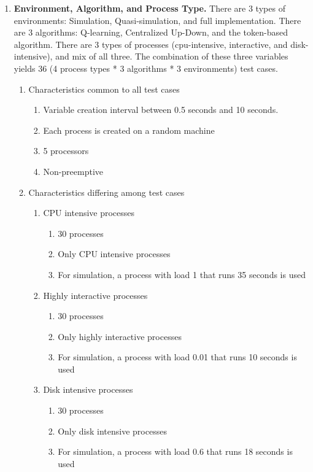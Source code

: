 \documentclass{report}
\begin{document}
\begin{enumerate}
  \item \textbf{Environment, Algorithm, and Process Type.}
	There are 3 types of environments: Simulation, Quasi-simulation, and
	full implementation.  There are 3 algorithms: Q-learning,
	Centralized Up-Down, and the token-based algorithm.  There are 3
	types of processes (cpu-intensive, interactive, and disk-intensive),
	and mix of all three.  The combination of these three variables
	yields 36 (4 process types * 3 algorithms * 3 environments) test
	cases. 

  \begin{enumerate}

	\item Characteristics common to all test cases
	\begin{enumerate}
	    \item Variable creation interval between 0.5 seconds and 10
		seconds. 
      	    \item Each process is created on a random machine
	    \item 5 processors
	    \item Non-preemptive
	\end{enumerate}

	\item Characteristics differing among test cases

	\begin{enumerate}
	   \item CPU intensive processes
	   \begin{enumerate}
		\item 30 processes
		\item Only CPU intensive processes
		\item For simulation, a process with load 1 that runs
		 35 seconds is used
	   \end{enumerate}

	   \item Highly interactive processes
	   \begin{enumerate}
		\item 30 processes
		\item Only highly interactive processes
		\item For simulation, a process with load 0.01 that runs
		 10 seconds is used
	   \end{enumerate}

	   \item Disk intensive processes
	   \begin{enumerate}
		\item 30 processes
		\item Only disk intensive processes
		\item For simulation, a process with load 0.6 that runs
		 18 seconds is used
	   \end{enumerate}


\end{enumerate}
\end{enumerate}
\end{enumerate}
\end{document}
